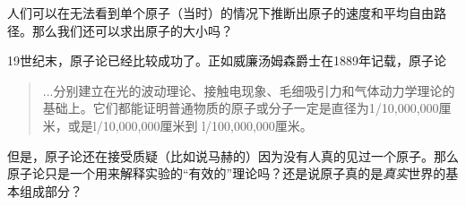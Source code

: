 人们可以在无法看到单个原子（当时）的情况下推断出原子的速度和平均自由路径。那么我们还可以求出原子的大小吗？


19世纪末，原子论已经比较成功了。正如威廉汤姆森爵士在1889年记载，原子论
\begin{quote}
    ...分别建立在光的波动理论、接触电现象、毛细吸引力和气体动力学理论的基础上。它们都能证明普通物质的原子或分子一定是直径为1/10,000,000厘米，或是l/10,000,000厘米到 l/100,000,000厘米。
\end{quote}

但是，原子论还在接受质疑（比如说马赫的）因为没有人真的见过一个原子。那么原子论只是一个用来解释实验的“有效的”理论吗？还是说原子真的是\emph{真实}世界的基本组成部分？

